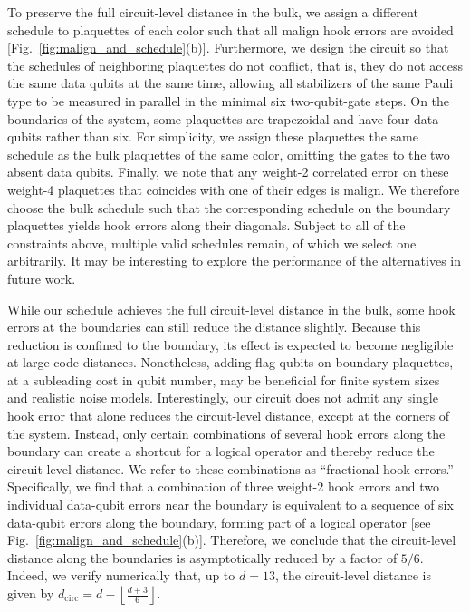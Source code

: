 \documentclass[twocolumn,
aps,
prx,
showpacs,
amsmath,
amssymb,
floatfix,
longbibliography,
superscriptaddress,
eprint]
{revtex4-1}
\begin{document}
To preserve the full circuit-level distance in the bulk, we assign a different schedule to plaquettes of each color such that all malign hook errors are avoided [Fig.~\ref{fig:malign_and_schedule}(b)].
Furthermore, we design the circuit so that the schedules of neighboring plaquettes do not conflict, that is, they do not access the same data qubits at the same time, allowing all stabilizers of the same Pauli type to be measured in parallel in the minimal six two-qubit-gate steps.
On the boundaries of the system, some plaquettes are trapezoidal and have four data qubits rather than six.
For simplicity, we assign these plaquettes the same schedule as the bulk plaquettes of the same color, omitting the gates to the two absent data qubits.
Finally, we note that any weight-2 correlated error on these weight-4 plaquettes that coincides with one of their edges is malign.
We therefore choose the bulk schedule such that the corresponding schedule on the boundary plaquettes yields hook errors along their diagonals.
Subject to all of the constraints above, multiple valid schedules remain, of which we select one arbitrarily.
It may be interesting to explore the performance of the alternatives in future work.

While our schedule achieves the full circuit-level distance in the bulk, some hook errors at the boundaries can still reduce the distance slightly.
Because this reduction is confined to the boundary, its effect is expected to become negligible at large code distances.
Nonetheless, adding flag qubits on boundary plaquettes, at a subleading cost in qubit number, may be beneficial for finite system sizes and realistic noise models.
Interestingly, our circuit does not admit any single hook error that alone reduces the circuit-level distance, except at the corners of the system.
Instead, only certain combinations of several hook errors along the boundary can create a shortcut for a logical operator and thereby reduce the circuit-level distance.
We refer to these combinations as ``fractional hook errors.''
Specifically, we find that a combination of three weight-2 hook errors and two individual data-qubit errors near the boundary is equivalent to a sequence of six data-qubit errors along the boundary, forming part of a logical operator [see Fig.~\ref{fig:malign_and_schedule}(b)].
Therefore, we conclude that the circuit-level distance along the boundaries is asymptotically reduced by a factor of $5/6$.
Indeed, we verify numerically that, up to $d=13$, the circuit-level distance is given by $d_{\mathrm{circ}} = d - \left\lfloor \frac{d+3}{6} \right\rfloor$.
\end{document}
